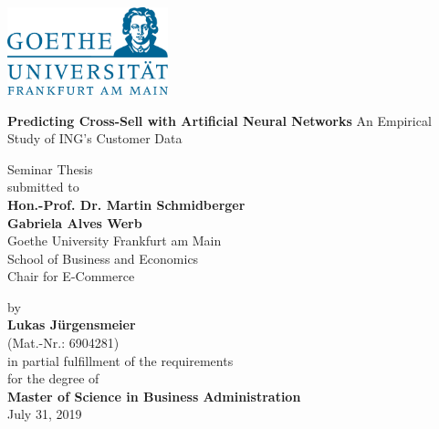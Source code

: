 \documentclass[12pt,a4paper]{article}
\begin{document}
\begin{center}
 \includegraphics[width=0.35\textwidth]{GU-Logo-blau-CMYK.eps} \vspace{2cm}
  
  {\Large{\bf Predicting Cross-Sell with Artificial Neural Networks}} \newline
  {\Large{An Empirical Study of ING's Customer Data}} \vspace{0.5cm}

  Seminar Thesis \\\vspace{2cm}
  submitted to \\\vspace{0.5cm}
  \textbf{Hon.-Prof. Dr. Martin Schmidberger} \\
  \textbf{Gabriela Alves Werb} \\\vspace{0.5cm}
  Goethe University Frankfurt am Main \\
  School of Business and Economics \\
  Chair for E-Commerce \vspace{2cm}
  
  by \\\vspace{0.5cm}
  \textbf{Lukas J\"urgensmeier} \\
  (Mat.-Nr.: 6904281) \\
  
  \medskip
  \medskip
  in partial fulfillment of the requirements \\
  for the degree of \\\vspace{0.5cm}
  \textbf{Master of Science in Business Administration} \\\vspace{0.5cm}
  July 31, 2019
  
\end{center}


\pagebreak
\pagestyle{plain}
\tableofcontents
\pagebreak
\listoffigures
\listoftables
\newpage
\setcounter{page}{2}
\setlength{\baselineskip}{1.5\baselineskip}
\pagestyle{plain}
\end{document}
